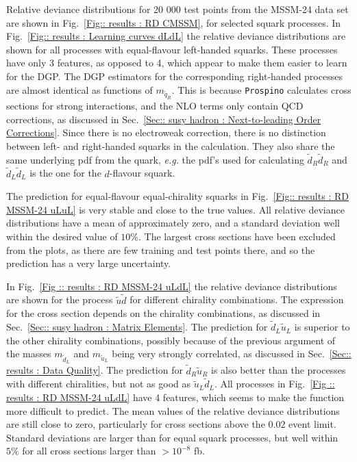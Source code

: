 \documentclass[twoside,english]{uiofysmaster}
\begin{document}
Relative deviance distributions for 20 000 test points from the MSSM-24 data set are shown in Fig.~\ref{Fig:: results : RD CMSSM}, for selected squark processes. In Fig.~\ref{Fig:: results : Learning curves dLdL} the relative deviance distributions are shown for all processes with equal-flavour left-handed squarks. These processes have only 3 features, as opposed to 4, which appear to make them easier to learn for the DGP. The DGP estimators for the corresponding right-handed processes are almost identical as functions of $m_{\widetilde{q}_R}$. This is because \verb|Prospino| calculates cross sections for strong interactions, and the NLO terms only contain QCD corrections, as discussed in Sec.~\ref{Sec:: susy hadron : Next-to-leading Order Corrections}. Since there is no electroweak correction, there is no distinction between left- and right-handed squarks in the calculation. They also share the same underlying pdf from the quark, \textit{e.g.} the pdf's used for calculating $\widetilde{d}_R \widetilde{d}_R$ and $\widetilde{d}_L \widetilde{d}_L$ is the one for the $d$-flavour squark.





The prediction for equal-flavour equal-chirality squarks in Fig.~\ref{Fig:: results : RD MSSM-24 uLuL} is very stable and close to the true values. All relative deviance distributions have a mean of approximately zero, and a standard deviation well within the desired value of $10 \%$. The largest cross sections have been excluded from the plots, as there are few training and test points there, and so the prediction has a very large uncertainty.

In Fig.~\ref{Fig :: results : RD MSSM-24 uLdL} the relative deviance distributions are shown for the process $\widetilde{u} \widetilde{d}$ for different chirality combinations. The expression for the cross section depends on the chirality combinations, as discussed in Sec.~\ref{Sec:: susy hadron : Matrix Elements}. The prediction for $\widetilde{d}_L \widetilde{u}_L$ is superior to the other chirality combinations, possibly because of the previous argument of the masses $m_{\widetilde{d}_L}$ and $m_{\widetilde{u}_L}$ being very strongly correlated, as discussed in Sec.~\ref{Sec:: results : Data Quality}. The prediction for $\widetilde{d}_R \widetilde{u}_R$ is also better than the processes with different chiralities, but not as good as $\widetilde{u}_L\widetilde{d}_L$. All processes in Fig.~\ref{Fig :: results : RD MSSM-24 uLdL} have 4 features, which seems to make the function more difficult to predict. The mean values of the relative deviance distributions are still close to zero, particularly for cross sections above the $0.02$ event limit. Standard deviations are larger than for equal squark processes, but well within $5\%$ for all cross sections larger than $> 10^{-8}$ fb.
\end{document}
